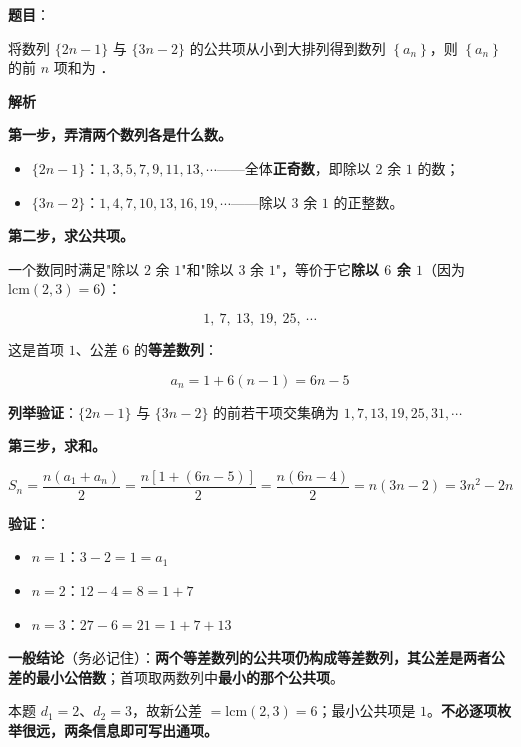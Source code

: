 \begin{answer}

\textbf{题目}：

将数列 $\{2n-1\}$ 与 $\{3n-2\}$ 的公共项从小到大排列得到数列 $\left\{a_n\right\}$，则 $\left\{a_n\right\}$ 的前 $n$ 项和为 \gkblank{}．

\textbf{解析}

\textbf{第一步，弄清两个数列各是什么数。}

\begin{itemize}
\item $\{2n-1\}$：$1,3,5,7,9,11,13,\cdots$——全体\textbf{正奇数}，即除以 $2$ 余 $1$ 的数；
\item $\{3n-2\}$：$1,4,7,10,13,16,19,\cdots$——除以 $3$ 余 $1$ 的正整数。
\end{itemize}

\textbf{第二步，求公共项。}

一个数同时满足"除以 $2$ 余 $1$"和"除以 $3$ 余 $1$"，等价于它\textbf{除以 $6$ 余 $1$}（因为 $\mathrm{lcm}(2,3)=6$）：

\nopagebreak[4]
\[1,\ 7,\ 13,\ 19,\ 25,\ \cdots\]

这是首项 $1$、公差 $6$ 的\textbf{等差数列}：

\nopagebreak[4]
\[a_n=1+6(n-1)=6n-5\]

\textbf{列举验证}：$\{2n-1\}$ 与 $\{3n-2\}$ 的前若干项交集确为 $1,7,13,19,25,31,\cdots$ 

\textbf{第三步，求和。}

\nopagebreak[4]
\[S_n=\frac{n\left(a_1+a_n\right)}2=\frac{n\left[1+(6n-5)\right]}2=\frac{n(6n-4)}2=n(3n-2)=3n^{2}-2n\]

\textbf{验证}：

\begin{itemize}
\item $n=1$：$3-2=1=a_1$ 
\item $n=2$：$12-4=8=1+7$ 
\item $n=3$：$27-6=21=1+7+13$ 
\end{itemize}

\begin{gktip}
\textbf{一般结论}（务必记住）：\textbf{两个等差数列的公共项仍构成等差数列，其公差是两者公差的最小公倍数}；首项取两数列中\textbf{最小的那个公共项}。

本题 $d_1=2$、$d_2=3$，故新公差 $=\mathrm{lcm}(2,3)=6$；最小公共项是 $1$。\textbf{不必逐项枚举很远，两条信息即可写出通项。}
\end{gktip}


\par\medskip

\end{answer}
